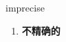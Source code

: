 
\begin{frame}
{\huge imprecise}
\begin{center}
\begin{enumerate}\Large
  \item \textbf{不精确的}
\end{enumerate}
\end{center}
\end{frame}
